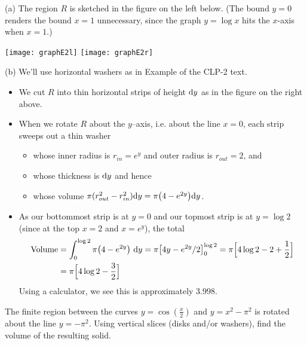 \begin{solution} (a)
The region $R$ is sketched in the figure on the left below. (The bound $y=0$ renders the bound $x=1$ unnecessary, since the graph $y=\log x$ hits the $x$-axis when $x=1$.)

\begin{center}
       \texttt{[image: graphE2l]}\qquad
       \texttt{[image: graphE2r]}
\end{center}

\noindent (b)
We'll use horizontal washers as in Example  
of the %
CLP-2 text.
 \begin{itemize}
\item We cut $R$ into thin horizontal  strips of height $\mathrm{d}y$ as in
the figure on the right above.

\item When we rotate $R$ about the $y$--axis, i.e. about the line $x=0$,
each strip sweeps out a thin washer
\begin{itemize}
\item whose inner radius is $r_{in}= e^y$ and outer radius is $r_{out}=2$, and
\item whose thickness is $\mathrm{d}y$ and hence
\item whose volume $\pi(r_{out}^2 - r_{in}^2)\mathrm{d}y = \pi\big(4-e^{2y}\big)\mathrm{d}y$.
\end{itemize}
\item As our bottommost strip is at $y=0$ and our topmost
strip is at $y=\log 2$ (since at the top $x=2$ and $x=e^y$), the total
\begin{align*}
\text{Volume}
&= \int _0^{\log 2} \pi\big(4-e^{2y}\big)\ \mathrm{d}y
=\pi\big[4y -e^{2y}/2\big]_0^{\log 2}
=\pi\Big[4\log 2 - 2 +\frac{1}{2}\Big] \\
&=\pi\Big[4\log 2 - \frac{3}{2}\Big]
\end{align*}
Using a calculator, we see this is approximately $3.998$.
\end{itemize}
\end{solution}

\begin{question}[2016Q3] %
The finite region between the curves $y = \cos(\frac x2)$
and $y = x^2 - \pi^2$ is rotated about the line $y=-{\pi^2}$.
Using vertical slices (disks and/or washers), find the volume of
the resulting solid.
\end{question}

